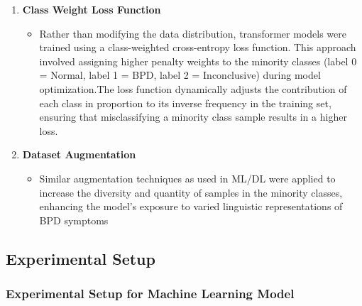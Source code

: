 \begin{enumerate}
    \item \textbf{Class Weight Loss Function}
    \begin{itemize}
        \item Rather than modifying the data distribution, transformer models were trained using a class-weighted cross-entropy loss function. This approach involved assigning higher penalty weights to the minority classes (label 0 = Normal, label 1 = BPD, label 2 = Inconclusive) during model optimization.The loss function dynamically adjusts the contribution of each class in proportion to its inverse frequency in the training set, ensuring that misclassifying a minority class sample results in a higher loss.
    \end{itemize}

    \item \textbf{Dataset Augmentation}
    \begin{itemize}
        \item Similar augmentation techniques as used in ML/DL were applied to increase the diversity and quantity of samples in the minority classes, enhancing the model's exposure to varied linguistic representations of BPD symptoms
    \end{itemize}
\end{enumerate}

\subsection{Experimental Setup}
\subsubsection{Experimental Setup for Machine Learning Model}


